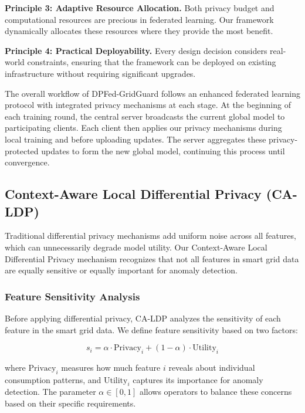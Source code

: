 \documentclass{ieeeaccess}
\theoremstyle{definition}
\begin{document}
\textbf{Principle 3: Adaptive Resource Allocation.} Both privacy budget and computational resources are precious in federated learning. Our framework dynamically allocates these resources where they provide the most benefit.

\textbf{Principle 4: Practical Deployability.} Every design decision considers real-world constraints, ensuring that the framework can be deployed on existing infrastructure without requiring significant upgrades.

The overall workflow of DPFed-GridGuard follows an enhanced federated learning protocol with integrated privacy mechanisms at each stage. At the beginning of each training round, the central server broadcasts the current global model to participating clients. Each client then applies our privacy mechanisms during local training and before uploading updates. The server aggregates these privacy-protected updates to form the new global model, continuing this process until convergence.

\subsection{Context-Aware Local Differential Privacy (CA-LDP)}

Traditional differential privacy mechanisms add uniform noise across all features, which can unnecessarily degrade model utility. Our Context-Aware Local Differential Privacy mechanism recognizes that not all features in smart grid data are equally sensitive or equally important for anomaly detection.

\subsubsection{Feature Sensitivity Analysis}

Before applying differential privacy, CA-LDP analyzes the sensitivity of each feature in the smart grid data. We define feature sensitivity based on two factors:

\begin{equation}
s_i = \alpha \cdot \text{Privacy}_i + (1-\alpha) \cdot \text{Utility}_i
\end{equation}

where $\text{Privacy}_i$ measures how much feature $i$ reveals about individual consumption patterns, and $\text{Utility}_i$ captures its importance for anomaly detection. The parameter $\alpha \in [0,1]$ allows operators to balance these concerns based on their specific requirements.
\end{document}

